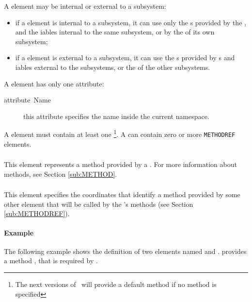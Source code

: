 A  element may be internal or external to a subsystem:

\begin{itemize}
\item if a  element is internal to a subsystem, it can use
  only the s provided by the , and the
  iables internal to the same subsystem, or by the
   of its own subsystem;
\item if a  element is external to a subsystem, it can use
  the s provided by s and iables
  external to the subsystems, or the  of
  the other subsystems.
\end{itemize}

A  element has only one attribute:

\begin{description}
\item [{attribute~Name}] this attribute specifies the 
  name inside the current namespace.
\end{description}

A  element must contain at least one
\footnote{The next versions of \rtd\ will provide a
  default method if no method is specified}. A  can
contain zero or more \texttt{METHODREF} elements.


\subsubsection{}

This element represents a method provided by a . For more
information about methods, see Section \ref{sub:METHOD}.


\subsubsection{}

This element specifies the coordinates that identify a method provided
by some other element that will be called by the 's
methods (see Section \ref{sub:METHODREF}).


\paragraph{Example}

The following example shows the definition of two  elements
named  and .  provides
a method , that is required by .

